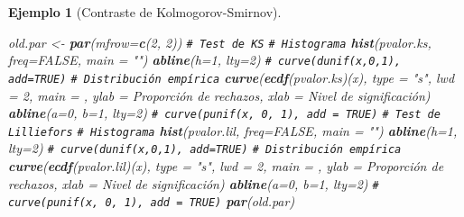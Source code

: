 \documentclass[
  spanish,
  10pt,
]{book}
\newenvironment{Shaded}{\begin{snugshade}}{\end{snugshade}}
\newcommand{\AttributeTok}[1]{\textcolor[rgb]{0.13,0.29,0.53}{#1}}
\newcommand{\CommentTok}[1]{\textcolor[rgb]{0.56,0.35,0.01}{\textit{#1}}}
\newcommand{\ConstantTok}[1]{\textcolor[rgb]{0.56,0.35,0.01}{#1}}
\newcommand{\DecValTok}[1]{\textcolor[rgb]{0.00,0.00,0.81}{#1}}
\newcommand{\FunctionTok}[1]{\textcolor[rgb]{0.13,0.29,0.53}{\textbf{#1}}}
\newcommand{\NormalTok}[1]{#1}
\newcommand{\OtherTok}[1]{\textcolor[rgb]{0.56,0.35,0.01}{#1}}
\newcommand{\StringTok}[1]{\textcolor[rgb]{0.31,0.60,0.02}{#1}}
\theoremstyle{break}
\newtheorem{example}{Ejemplo}[chapter]
\theoremstyle{nonumberplain}
\renewcommand{\CommentTok}[1]{\textcolor[rgb]{0.41,0.41,0.41}{\texttt{#1}}}
\begin{document}
\begin{example}[Contraste de Kolmogorov-Smirnov]
\begin{Shaded}
\begin{Highlighting}[]
\NormalTok{old.par }\OtherTok{\textless{}{-}} \FunctionTok{par}\NormalTok{(}\AttributeTok{mfrow=}\FunctionTok{c}\NormalTok{(}\DecValTok{2}\NormalTok{, }\DecValTok{2}\NormalTok{))}
\CommentTok{\# Test de KS}
  \CommentTok{\# Histograma}
\FunctionTok{hist}\NormalTok{(pvalor.ks, }\AttributeTok{freq=}\ConstantTok{FALSE}\NormalTok{, }\AttributeTok{main =} \StringTok{""}\NormalTok{)}
\FunctionTok{abline}\NormalTok{(}\AttributeTok{h=}\DecValTok{1}\NormalTok{, }\AttributeTok{lty=}\DecValTok{2}\NormalTok{)   }\CommentTok{\# curve(dunif(x,0,1), add=TRUE)}
  \CommentTok{\# Distribución empírica}
\FunctionTok{curve}\NormalTok{(}\FunctionTok{ecdf}\NormalTok{(pvalor.ks)(x), }\AttributeTok{type =} \StringTok{"s"}\NormalTok{, }\AttributeTok{lwd =} \DecValTok{2}\NormalTok{, }\AttributeTok{main =} \StringTok{\textquotesingle{}\textquotesingle{}}\NormalTok{, }
      \AttributeTok{ylab =} \StringTok{\textquotesingle{}Proporción de rechazos\textquotesingle{}}\NormalTok{, }\AttributeTok{xlab =} \StringTok{\textquotesingle{}Nivel de significación\textquotesingle{}}\NormalTok{)}
\FunctionTok{abline}\NormalTok{(}\AttributeTok{a=}\DecValTok{0}\NormalTok{, }\AttributeTok{b=}\DecValTok{1}\NormalTok{, }\AttributeTok{lty=}\DecValTok{2}\NormalTok{)   }\CommentTok{\# curve(punif(x, 0, 1), add = TRUE)}
\CommentTok{\# Test de Lilliefors}
  \CommentTok{\# Histograma}
\FunctionTok{hist}\NormalTok{(pvalor.lil, }\AttributeTok{freq=}\ConstantTok{FALSE}\NormalTok{, }\AttributeTok{main =} \StringTok{""}\NormalTok{)}
\FunctionTok{abline}\NormalTok{(}\AttributeTok{h=}\DecValTok{1}\NormalTok{, }\AttributeTok{lty=}\DecValTok{2}\NormalTok{)   }\CommentTok{\# curve(dunif(x,0,1), add=TRUE)}
  \CommentTok{\# Distribución empírica}
\FunctionTok{curve}\NormalTok{(}\FunctionTok{ecdf}\NormalTok{(pvalor.lil)(x), }\AttributeTok{type =} \StringTok{"s"}\NormalTok{, }\AttributeTok{lwd =} \DecValTok{2}\NormalTok{, }\AttributeTok{main =} \StringTok{\textquotesingle{}\textquotesingle{}}\NormalTok{, }
      \AttributeTok{ylab =} \StringTok{\textquotesingle{}Proporción de rechazos\textquotesingle{}}\NormalTok{,  }\AttributeTok{xlab =} \StringTok{\textquotesingle{}Nivel de significación\textquotesingle{}}\NormalTok{)}
\FunctionTok{abline}\NormalTok{(}\AttributeTok{a=}\DecValTok{0}\NormalTok{, }\AttributeTok{b=}\DecValTok{1}\NormalTok{, }\AttributeTok{lty=}\DecValTok{2}\NormalTok{)   }\CommentTok{\# curve(punif(x, 0, 1), add = TRUE)}
\FunctionTok{par}\NormalTok{(old.par)}
\end{Highlighting}
\end{Shaded}


\end{example}
\end{document}
